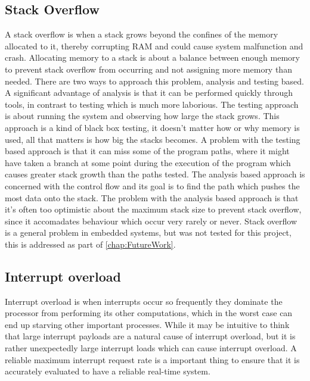 \subsection{Stack Overflow}
\label{sec:Stack Overflow}
A stack overflow is when a stack grows beyond the confines of the memory allocated to it, thereby corrupting RAM and could cause system malfunction and crash. Allocating memory to a stack is about a balance between enough memory to prevent stack overflow from occurring and not assigning more memory than needed. There are two ways to approach this problem, analysis and testing based. A significant advantage of analysis is that it can be performed quickly through tools, in contrast to testing which is much more laborious. \newline 
The testing approach is about running the system and observing how large the stack grows. This approach is a kind of black box testing, it doesn’t matter how or why memory is used, all that matters is how big the stacks becomes. A problem with the testing based approach is that it can miss some of the program paths, where it might have taken a branch at some point during the execution of the program which causes greater stack growth than the paths tested. \newline
The analysis based approach is concerned with the control flow and its goal is to find the path which pushes the most data onto the stack. The problem with the analysis based approach is that it's often too optimistic about the maximum stack size to prevent stack overflow, since it accomadates behaviour which occur very rarely or never. \newline
Stack overflow is a general problem in embedded systems, but was not tested for this project, this is addressed as part of \ref{chap:FutureWork}. 

\subsection{Interrupt overload}
\label{sec:Interrupt overload}
Interrupt overload is when interrupts occur so frequently they dominate the processor from performing its other computations, which in the worst case can end up starving other important processes. While it may be intuitive to think that large interrupt payloads are a natural cause of interrupt overload, but it is rather unexpectedly large interrupt loads which can cause interrupt overload. A reliable maximum interrupt request rate is a important thing to ensure that it is accurately evaluated to have a reliable real-time system.


